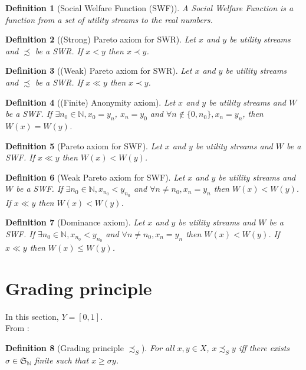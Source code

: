 \documentclass{article}
\newtheorem{definition}{Definition}
\begin{document}
\begin{definition}[Social Welfare Function (SWF)]
  A Social Welfare Function is a function from a set of utility streams to the real numbers.
\end{definition}

\begin{definition}[(Strong) Pareto axiom for SWR]
  Let $x$ and $y$ be utility streams and $\precsim$ be a SWR.
  If $x < y$ then $x\prec y$.
\end{definition}

\begin{definition}[(Weak) Pareto axiom for SWR]
  Let $x$ and $y$ be utility streams and $\precsim$ be a SWR.
  If $x \ll y$ then $x\prec y$.
\end{definition}


\begin{definition}[(Finite) Anonymity axiom]
  Let $x$ and $y$ be utility streams and $W$ be a SWF.
  If $\exists n_0 \in\mathbb N,x_0=y_n$, $x_n=y_0$ and $\forall n\notin\{0,n_0\}, x_n=y_n$, then $W(x)=W(y)$.
\end{definition}

\begin{definition}[Pareto axiom for SWF]
  Let $x$ and $y$ be utility streams and $W$ be a SWF.
  If $x\ll y$ then $W(x)<W(y)$.
\end{definition}

\begin{definition}[Weak Pareto axiom for SWF]
  Let $x$ and $y$ be utility streams and $W$ be a SWF.
  If $\exists n_0\in\mathbb N, x_{n_0}<y_{n_0}$ and $\forall n\neq n_0, x_n=y_n$ then $W(x)<W(y)$.
  If $x\ll y$ then $W(x)< W(y)$.
\end{definition}

\begin{definition}[Dominance axiom]
  Let $x$ and $y$ be utility streams and $W$ be a SWF.
  If $\exists n_0\in\mathbb N, x_{n_0}<y_{n_0}$ and $\forall n\neq n_0, x_n=y_n$ then $W(x)<W(y)$.
  If $x\ll y$ then $W(x)\leq W(y)$.
\end{definition}


\section{Grading principle}

In this section, $Y=[0,1]$.
\smallskip\\
From \cite{svensson80}:
\begin{definition}[Grading principle $\precsim_S$]
  For all $x,y\in X$, $x \precsim_S y$ iff there exists
  $\sigma\in\mathfrak{S}_{\mathbb{N}}$ finite
  such that $x\geq\sigma y$.
\end{definition}
\end{document}
